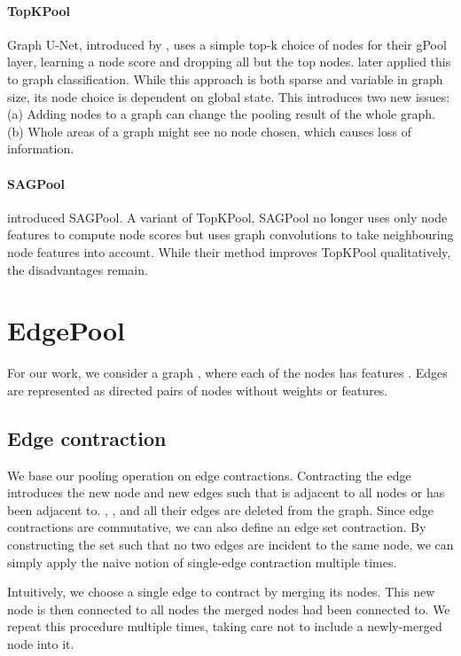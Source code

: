 \documentclass{article}
\newcommand{\edgepool}{EdgePool}
\begin{document}
\paragraph{TopKPool} Graph U-Net, introduced by \citet{gaoGraphUNet2018a}, uses a simple top-k choice of nodes for their gPool layer, learning a node score and dropping all but the top nodes. \citet{cangeaSparseHierarchicalGraph2018a} later applied this  to graph classification. While this approach is both sparse and variable in graph size, its node choice is dependent on global state. This introduces two new issues: (a) Adding nodes to a graph can change the pooling result of the whole graph. (b) Whole areas of a graph might see no node chosen, which causes loss of information. 

\paragraph{SAGPool} \citet{leeSelfAttentionGraphPooling2019} introduced \gls{SAGPool}. A variant of TopKPool, \gls{SAGPool} no longer uses only node features to compute node scores but uses graph convolutions to take neighbouring node features into account. While their method improves TopKPool qualitatively, the disadvantages remain. 
\section{\edgepool{}}

For our work, we consider a graph , where each of the  nodes has  features . Edges are represented as directed pairs of nodes without weights or features.

\subsection{Edge contraction}

We base our pooling operation on edge contractions. Contracting the edge  introduces the new node  and new edges such that  is adjacent to all nodes  or  has been adjacent to. , , and all their edges are deleted from the graph. Since edge contractions are commutative, we can also define an edge set contraction. By constructing the set such that no two edges are incident to the same node, we can simply apply the naive notion of single-edge contraction multiple times.

Intuitively, we choose a single edge to contract by merging its nodes. This new node is then connected to all nodes the merged nodes had been connected to. We repeat this procedure multiple times, taking care not to include a newly-merged node into it.
\end{document}
